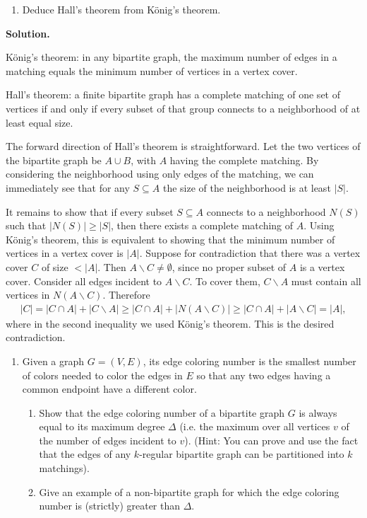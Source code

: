 \documentclass[11pt,letterpaper]{article}
\theoremstyle{definition}
\newcommand{\solution}{\medskip\noindent\textbf{Solution.}\par\medskip}
\begin{document}
\begin{enumerate}[resume]
\item Deduce Hall's theorem from K\"onig's theorem.
\end{enumerate}

\solution
K\"onig's theorem: in any bipartite graph, the maximum number of edges in a matching equals the minimum number of vertices in a vertex cover.

Hall's theorem: a finite bipartite graph has a complete matching of one set of vertices if and only if every subset of that group connects to a neighborhood of at least equal size.

The forward direction of Hall's theorem is straightforward.
Let the two vertices of the bipartite graph be $A\cup B$, with $A$ having the complete matching.
By considering the neighborhood using only edges of the matching, we can immediately see that for any $S\subseteq A$ the size of the neighborhood is at least $|S|$.

It remains to show that if every subset $S\subseteq A$ connects to a neighborhood $N(S)$ such that $|N(S)|\geq |S|$, then there exists a complete matching of $A$.
Using K\"onig's theorem, this is equivalent to showing that the minimum number of vertices in a vertex cover is $|A|$. 
Suppose for contradiction that there was a vertex cover $C$ of size $<|A|$.
Then $A\backslash C \neq \emptyset$, since no proper subset of $A$ is a vertex cover.
Consider all edges incident to $A\backslash C$. 
To cover them, $C\backslash A$ must contain all vertices in $N(A\backslash C)$.
Therefore 
\begin{align*}
    |C| = |C\cap A| + |C\backslash A| \geq |C\cap A| + |N(A\backslash C)|\geq |C\cap A| + |A\backslash C| = |A|,
\end{align*}
where in the second inequality we used K\"onig's theorem. This is the desired contradiction.


\begin{enumerate}[resume]
\item Given a graph $G = (V,E)$, its edge coloring number is the smallest number of colors needed to color the edges in $E$ so that any two edges having a common endpoint have a different color.
\begin{enumerate}
\item Show that the edge coloring number of a bipartite graph $G$ is always equal to its maximum degree $\Delta$ (i.e. the maximum over all vertices $v$ of the number of edges incident to $v$). (Hint: You can prove and use the fact that the edges of any $k$-regular bipartite graph can be partitioned into $k$ matchings).
\item Give an example of a non-bipartite graph for which the edge coloring number is (strictly) greater than $\Delta$.
\end{enumerate}
\end{enumerate}
\end{document}
